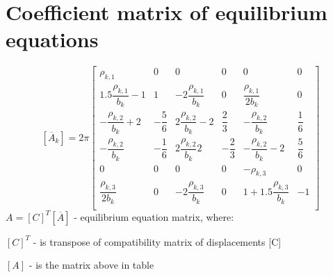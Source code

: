\section*{Coefficient matrix of equilibrium equations}
  \begin{equation}\label{eqn:eqMatrix}
    [\overline{A}_k]=2\pi
    \begin{bmatrix}
        \rho_{k,1} & 0 & 0 & 0 & 0 & 0 \\[2ex]
        1.5\dfrac{\rho_{k,1}}{b_k}-1 & 1 & -2\dfrac{\rho_{k,1}}{b_k} & 0 & \dfrac{\rho_{k,1}}{2b_k} & 0 \\[2ex]
        -\dfrac{\rho_{k,2}}{b_k}+2 & -\dfrac{5}{6} & 2\dfrac{\rho_{k,2}}{b_k}-2 & \dfrac{2}{3} & -\dfrac{\rho_{k,2}}{b_k} & \dfrac{1}{6} \\[2ex]
        -\dfrac{\rho_{k,2}}{b_k} & -\dfrac{1}{6} & 2\dfrac{\rho_{k,2}}{b_k}2 & -\dfrac{2}{3} & -\dfrac{\rho_{k,2}}{b_k}-2 & \dfrac{5}{6} \\[2ex]
        0 & 0 & 0 & 0 & -\rho_{k,3} & 0 \\[2ex]
        \dfrac{\rho_{k,3}}{2b_k} & 0 & -2\dfrac{\rho_{k,3}}{b_k} & 0 & 1+1.5\dfrac{\rho_{k,3}}{b_k} & -1 \\[2ex]
      \end{bmatrix}
  \end{equation}
$A=[C]^T[\overline{A}]$ - equilibrium equation matrix, where:\par
$[C]^T$ - is transpose of compatibility matrix of displacements [C]\par
$[A]$ - is the matrix above in table\par
